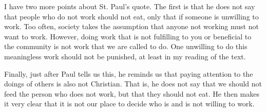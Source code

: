 \documentclass[12pt]{article}[titlepage]
\newcommand{\1}{\={a}}
\newcommand{\2}{\={e}}
\newcommand{\3}{\={\i}}
\newcommand{\4}{\=o}
\newcommand{\5}{\=u}
\newcommand{\6}{\={A}}
\renewcommand{\,}{\textsuperscript{,}}
\begin{document}
I have two more points about St. Paul's quote.
The first is that he does not say that people who do not work should not eat, only that if someone is unwilling to work.
Too often, society takes the assumption that anyone not working must not want to work.
However, doing work that is not fulfilling to you or beneficial to the community is not work that we are called to do.
One unwilling to do this meaningless work should not be punished, at least in my reading of the text.

Finally, just after Paul tells us this, he reminds us that paying attention to the doings of others is also not Christian.
That is, he does not say that we should not feed the person who does not work, but that they should not eat.
He then makes it very clear that it is not our place to decide who is and is not willing to work.
\end{document}
